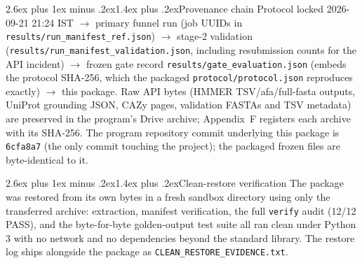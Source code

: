 \documentclass[11pt]{article}
\makeatletter
\renewcommand{\subsection}{\@startsection{subsection}{2}{\z@}%
  {2.6ex plus 1ex minus .2ex}{1.4ex plus .2ex}{\large\bfseries\color{navy}}}
\makeatother
\begin{document}
\subsection{Provenance chain}
Protocol locked 2026-09-21 21:24 IST $\to$ primary funnel run (job UUIDs in \texttt{results/run\_manifest\_ref.json}) $\to$ stage-2 validation (\texttt{results/run\_manifest\_validation.json}, including resubmission counts for the API incident) $\to$ frozen gate record \texttt{results/gate\_evaluation.json} (embeds the protocol SHA-256, which the packaged \texttt{protocol/protocol.json} reproduces exactly) $\to$ this package. Raw API bytes (HMMER TSV/afa/full-fasta outputs, UniProt grounding JSON, CAZy pages, validation FASTAs and TSV metadata) are preserved in the program's Drive archive; Appendix~F registers each archive with its SHA-256. The program repository commit underlying this package is \texttt{6cfa8a7} (the only commit touching the project); the packaged frozen files are byte-identical to it.

\subsection{Clean-restore verification}
The package was restored from its own bytes in a fresh sandbox directory using only the transferred archive: extraction, manifest verification, the full \texttt{verify} audit (12/12 PASS), and the byte-for-byte golden-output test suite all ran clean under Python 3 with no network and no dependencies beyond the standard library. The restore log ships alongside the package as \texttt{CLEAN\_RESTORE\_EVIDENCE.txt}.

\end{document}
